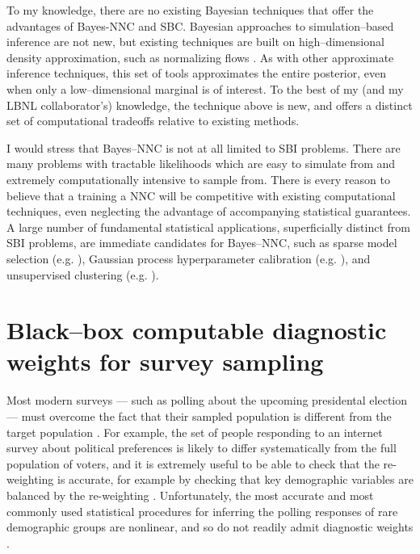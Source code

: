 To my knowledge, there are no existing Bayesian techniques that offer the
advantages of Bayes-NNC and SBC.  Bayesian approaches to simulation--based
inference are not new, but existing techniques are built on high--dimensional
density approximation, such as normalizing flows
\citep{cranmer:2020:frontierofsimulation}.  As with other approximate inference
techniques, this set of tools approximates the entire posterior, even when only
a low--dimensional marginal is of interest.  To the best of my (and my LBNL
collaborator's) knowledge, the technique above is new, and offers a distinct set
of computational tradeoffs relative to existing methods.  

I would stress that Bayes--NNC is not at all limited to SBI problems. There are
many problems with tractable likelihoods which are easy to simulate from and
extremely computationally intensive to sample from.  There is every reason to
believe that a training a NNC will be competitive with existing computational
techniques, even neglecting the advantage of accompanying statistical
guarantees.  A large number of fundamental statistical applications,
superficially distinct from SBI problems, are immediate candidates for
Bayes--NNC, such as sparse model selection (e.g.
\citep{rovckova:2018:spikeandslablasso}), Gaussian process hyperparameter
calibration (e.g. \citep{hensman:2015:gpclassificationscalable}), and
unsupervised clustering (e.g. \citet{mcauliffe:2006:dpeb}).



\section*{Black--box computable diagnostic weights for survey sampling}

Most modern surveys --- such as polling about the upcoming presidental election
--- must overcome the fact that their sampled population is different from the
target population \citep{gelman:2007:surveystruggles}.  For example, the set of
people responding to an internet survey about political preferences is likely to
differ systematically from the full population of voters, and it is extremely
useful to be able to check that the re-weighting is accurate, for example by
checking that key demographic variables are balanced by the re-weighting
\citep{li:2018:balancingcovariates,benmichael:2021:multilevel}. Unfortunately,
the most accurate and most commonly used statistical procedures for inferring
the polling responses of rare demographic groups are nonlinear, and so do not
readily admit diagnostic weights
\citep{gelman:1997:poststratification,gelman:2007:surveystruggles}. 

